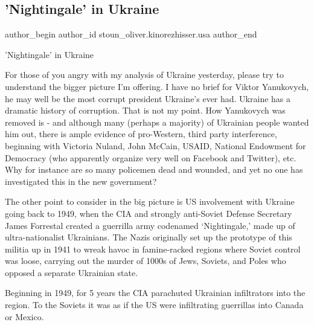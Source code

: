  
 
 
 
 
 
\subsection{'Nightingale' in Ukraine}
\label{sec:31_12_2014.fb.stoun_oliver.kinorezhisser.usa.1.nightingale_in_ukraine}
 
\ifcmt
 author_begin
   author_id stoun_oliver.kinorezhisser.usa
 author_end
\fi

'Nightingale' in Ukraine

For those of you angry with my analysis of Ukraine yesterday, please try to
understand the bigger picture I’m offering. I have no brief for Viktor
Yanukovych, he may well be the most corrupt president Ukraine’s ever had.
Ukraine has a dramatic history of corruption.  That is not my point. How
Yanukovych was removed is - and although many (perhaps a majority) of
Ukrainian people wanted him out, there is ample evidence of pro-Western, third
party interference, beginning with Victoria Nuland, John McCain, USAID,
National Endowment for Democracy (who apparently organize very well on Facebook
and Twitter), etc. Why for instance are so many policemen dead and wounded, and
yet no one has investigated this in the new government?

The other point to consider in the big picture is US involvement with Ukraine
going back to 1949, when the CIA and strongly anti-Soviet Defense Secretary
James Forrestal created a guerrilla army codenamed ‘Nightingale,’ made up of
ultra-nationalist Ukrainians. The Nazis originally set up the prototype of this
militia up in 1941 to wreak havoc in famine-racked regions where Soviet control
was loose, carrying out the murder of 1000s of Jews, Soviets, and Poles who
opposed a separate Ukrainian state. 

Beginning in 1949, for 5 years the CIA parachuted Ukrainian infiltrators into
the region. To the Soviets it was as if the US were infiltrating guerrillas
into Canada or Mexico. 

